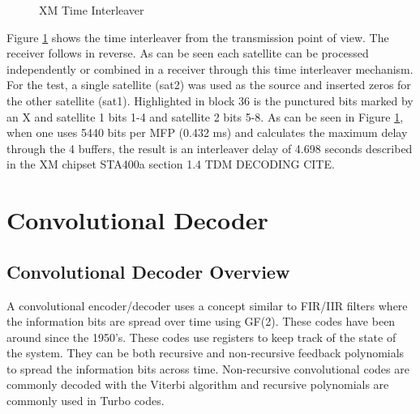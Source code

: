 \documentclass[conference,onecolumn]{IEEEtran}
\begin{document}
\begin{figure}[H]
	\centerline{}
	\caption{XM Time Interleaver}
	\label{fig::time_interleaver}
\end{figure}
Figure \ref{fig::time_interleaver} shows the time interleaver from the transmission point of view.  The receiver follows in reverse. As can be seen each satellite can be processed independently or combined in a receiver through this time interleaver mechanism.  For the test, a single satellite (sat2) was used as the source and inserted zeros for the other satellite (sat1). Highlighted in block 36 is the punctured bits marked by an X and satellite 1 bits 1-4 and satellite 2 bits 5-8.  As can be seen in Figure \ref{fig::time_interleaver}, when one uses 5440 bits per MFP (0.432 ms) and calculates the maximum delay through the 4 buffers, the result is an interleaver delay of 4.698 seconds described in the XM chipset STA400a section 1.4 TDM DECODING {CITE}.

\section{Convolutional Decoder}
\subsection{Convolutional Decoder Overview}
A convolutional encoder/decoder uses a concept similar to FIR/IIR filters where the information bits are spread over time using GF(2).  These codes have been around since the 1950's.  These codes use registers to keep track of the state of the system.  They can be both recursive and non-recursive feedback polynomials to spread the information bits across time.  Non-recursive convolutional codes are commonly decoded with the Viterbi algorithm and recursive polynomials are commonly used in Turbo codes.
\end{document}
